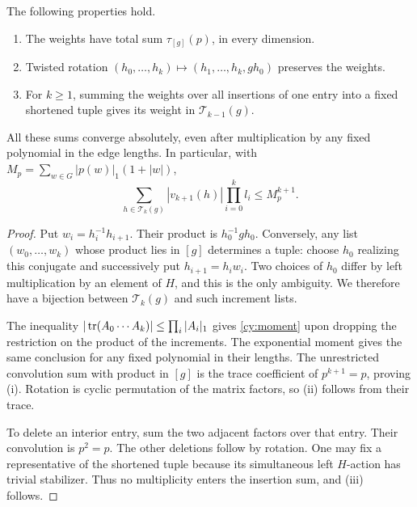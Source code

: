 \begin{lemma}\label{cy:weights-lemma}
The following properties hold.
\begin{enumerate}[label=\textup{(\roman*)}]
\item The weights have total sum $\tau_{[g]}(p)$, in every dimension.
\item Twisted rotation
$(h_0,\ldots,h_k)\mapsto(h_1,\ldots,h_k,gh_0)$ preserves the weights.
\item For $k\ge1$, summing the weights over all insertions of one entry
into a fixed shortened tuple gives its weight in $\mathcal T_{k-1}(g)$.
\end{enumerate}
All these sums converge absolutely, even after multiplication by any
fixed polynomial in the edge lengths. In particular, with
$M_p=\sum_{w\in G}|p(w)|_1(1+|w|)$,
\begin{equation}\label{cy:moment}
 \sum_{h\in\mathcal T_k(g)}|v_{k+1}(h)|\prod_{i=0}^k l_i
 \le M_p^{k+1}.
\end{equation}
\end{lemma}
\begin{proof}
Put $w_i=h_i^{-1}h_{i+1}$. Their product is $h_0^{-1}gh_0$.
Conversely, any list $(w_0,\ldots,w_k)$ whose product lies in $[g]$
determines a tuple: choose $h_0$ realizing this conjugate and successively
put $h_{i+1}=h_iw_i$. Two choices of $h_0$ differ by left multiplication
by an element of $H$, and this is the only ambiguity. We therefore have
a bijection between $\mathcal T_k(g)$ and such increment lists.

The inequality
$|\operatorname{tr}(A_0\cdots A_k)|\le\prod_i|A_i|_1$ gives
\eqref{cy:moment} upon dropping the restriction on the product of the
increments. The exponential moment gives the same conclusion for any
fixed polynomial in their lengths. The unrestricted convolution sum
with product in $[g]$ is the trace coefficient of $p^{k+1}=p$, proving
\textup{(i)}. Rotation is cyclic permutation of the matrix factors,
so \textup{(ii)} follows from their trace.

To delete an interior entry, sum the two adjacent factors over that
entry. Their convolution is $p^2=p$. The other deletions follow by
rotation. One may fix a representative of the shortened tuple because
its simultaneous left $H$-action has trivial stabilizer. Thus no
multiplicity enters the insertion sum, and \textup{(iii)} follows.
\end{proof}

